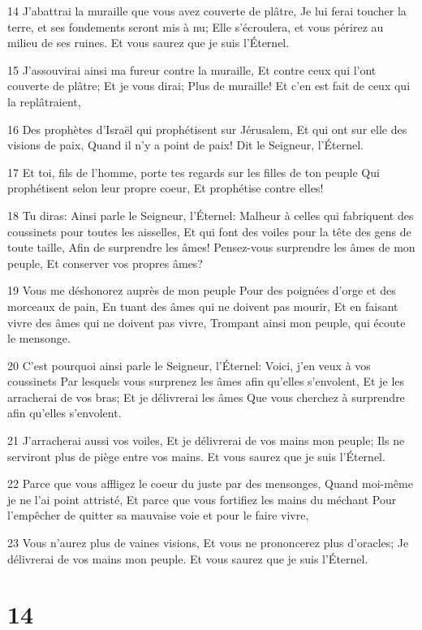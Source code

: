 \par 14 J'abattrai la muraille que vous avez couverte de plâtre, Je lui ferai toucher la terre, et ses fondements seront mis à nu; Elle s'écroulera, et vous périrez au milieu de ses ruines. Et vous saurez que je suis l'Éternel.
\par 15 J'assouvirai ainsi ma fureur contre la muraille, Et contre ceux qui l'ont couverte de plâtre; Et je vous dirai; Plus de muraille! Et c'en est fait de ceux qui la replâtraient,
\par 16 Des prophètes d'Israël qui prophétisent sur Jérusalem, Et qui ont sur elle des visions de paix, Quand il n'y a point de paix! Dit le Seigneur, l'Éternel.
\par 17 Et toi, fils de l'homme, porte tes regards sur les filles de ton peuple Qui prophétisent selon leur propre coeur, Et prophétise contre elles!
\par 18 Tu diras: Ainsi parle le Seigneur, l'Éternel: Malheur à celles qui fabriquent des coussinets pour toutes les aisselles, Et qui font des voiles pour la tête des gens de toute taille, Afin de surprendre les âmes! Pensez-vous surprendre les âmes de mon peuple, Et conserver vos propres âmes?
\par 19 Vous me déshonorez auprès de mon peuple Pour des poignées d'orge et des morceaux de pain, En tuant des âmes qui ne doivent pas mourir, Et en faisant vivre des âmes qui ne doivent pas vivre, Trompant ainsi mon peuple, qui écoute le mensonge.
\par 20 C'est pourquoi ainsi parle le Seigneur, l'Éternel: Voici, j'en veux à vos coussinets Par lesquels vous surprenez les âmes afin qu'elles s'envolent, Et je les arracherai de vos bras; Et je délivrerai les âmes Que vous cherchez à surprendre afin qu'elles s'envolent.
\par 21 J'arracherai aussi vos voiles, Et je délivrerai de vos mains mon peuple; Ils ne serviront plus de piège entre vos mains. Et vous saurez que je suis l'Éternel.
\par 22 Parce que vous affligez le coeur du juste par des mensonges, Quand moi-même je ne l'ai point attristé, Et parce que vous fortifiez les mains du méchant Pour l'empêcher de quitter sa mauvaise voie et pour le faire vivre,
\par 23 Vous n'aurez plus de vaines visions, Et vous ne prononcerez plus d'oracles; Je délivrerai de vos mains mon peuple. Et vous saurez que je suis l'Éternel.

\chapter{14}

